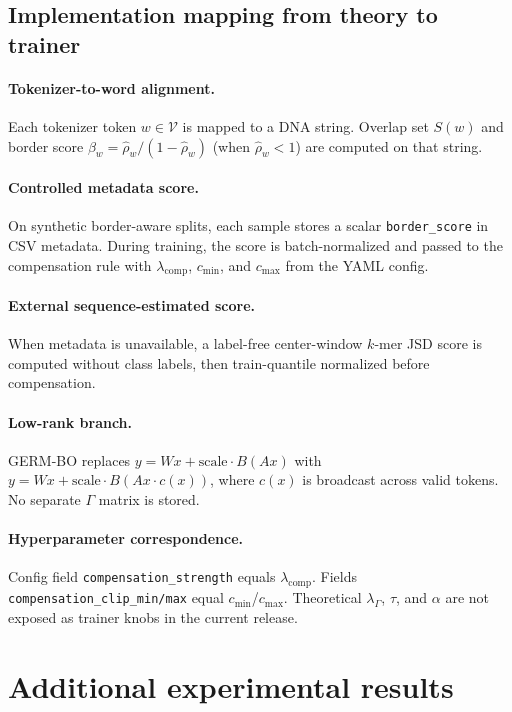 \documentclass[11pt,a4paper]{article}
\begin{document}
\subsection{Implementation mapping from theory to trainer}\label{app:implementation}

\paragraph{Tokenizer-to-word alignment.}
Each tokenizer token $w \in \mathcal{V}$ is mapped to a DNA string. Overlap set $S(w)$ and border score $\beta_w = \widehat{\rho}_w / (1-\widehat{\rho}_w)$ (when $\widehat{\rho}_w < 1$) are computed on that string.

\paragraph{Controlled metadata score.}
On synthetic border-aware splits, each sample stores a scalar \texttt{border\_score} in CSV metadata. During training, the score is batch-normalized and passed to the compensation rule with $\lambda_{\mathrm{comp}}$, $c_{\min}$, and $c_{\max}$ from the YAML config.

\paragraph{External sequence-estimated score.}
When metadata is unavailable, a label-free center-window $k$-mer JSD score is computed without class labels, then train-quantile normalized before compensation.

\paragraph{Low-rank branch.}
GERM-BO replaces $y = Wx + \mathrm{scale}\cdot B(Ax)$ with $y = Wx + \mathrm{scale}\cdot B(Ax \cdot c(x))$, where $c(x)$ is broadcast across valid tokens. No separate $\Gamma$ matrix is stored.

\paragraph{Hyperparameter correspondence.}
Config field \texttt{compensation\_strength} equals $\lambda_{\mathrm{comp}}$. Fields \texttt{compensation\_clip\_min/max} equal $c_{\min}$/$c_{\max}$. Theoretical $\lambda_{\Gamma}$, $\tau$, and $\alpha$ are not exposed as trainer knobs in the current release.

\section{Additional experimental results}\label{note:s2}
\end{document}
